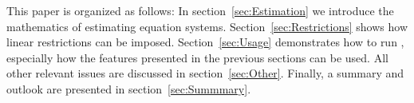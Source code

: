 This paper is organized as follows: In section~\ref{sec:Estimation} we
introduce the mathematics of estimating equation systems.
Section~\ref{sec:Restrictions} shows how linear restrictions can be
imposed.
Section~\ref{sec:Usage} demonstrates how to run
, especially how the features presented in the previous
sections can be used.
All other relevant issues are discussed in section~\ref{sec:Other}.
Finally, a summary and outlook are presented in
section~\ref{sec:Summmary}.



